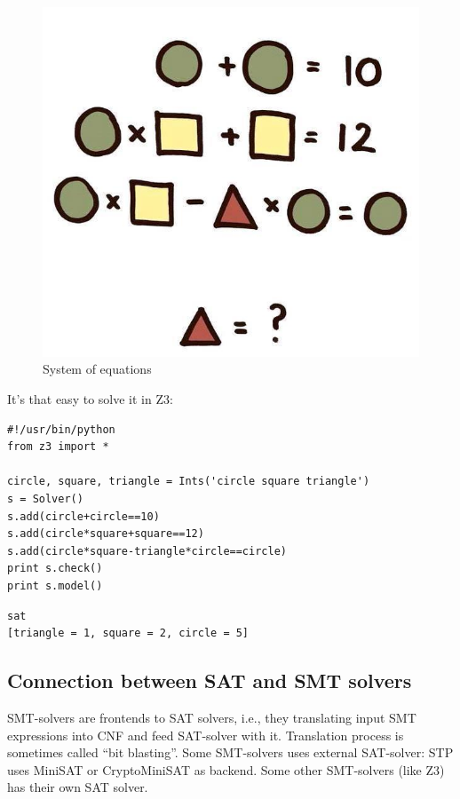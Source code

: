 \begin{figure}[H]
\centering
\includegraphics[scale=0.3]{SMT/equation.jpg}
\caption{System of equations}
\end{figure}

It's that easy to solve it in Z3:

\begin{lstlisting}
#!/usr/bin/python
from z3 import *

circle, square, triangle = Ints('circle square triangle')
s = Solver()
s.add(circle+circle==10)
s.add(circle*square+square==12)
s.add(circle*square-triangle*circle==circle)
print s.check()
print s.model()
\end{lstlisting}

\begin{lstlisting}
sat
[triangle = 1, square = 2, circle = 5]
\end{lstlisting}

\subsection{Connection between \ac{SAT} and \ac{SMT} solvers}

\ac{SMT}-solvers are frontends to \ac{SAT} solvers, i.e.,
they translating input SMT expressions into \ac{CNF} and feed SAT-solver with it.
Translation process is sometimes called ``bit blasting''.
Some \ac{SMT}-solvers uses external SAT-solver: STP uses MiniSAT or CryptoMiniSAT as backend.
Some other \ac{SMT}-solvers (like Z3) has their own SAT solver.

